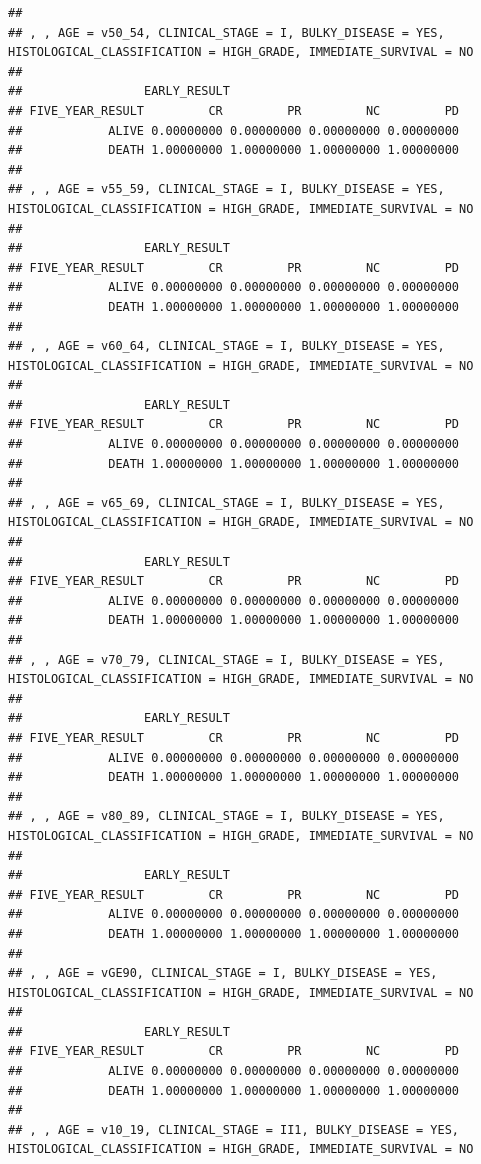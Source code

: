 \documentclass[]{article}
\begin{document}
\begin{verbatim}
## 
## , , AGE = v50_54, CLINICAL_STAGE = I, BULKY_DISEASE = YES, HISTOLOGICAL_CLASSIFICATION = HIGH_GRADE, IMMEDIATE_SURVIVAL = NO
## 
##                 EARLY_RESULT
## FIVE_YEAR_RESULT         CR         PR         NC         PD
##            ALIVE 0.00000000 0.00000000 0.00000000 0.00000000
##            DEATH 1.00000000 1.00000000 1.00000000 1.00000000
## 
## , , AGE = v55_59, CLINICAL_STAGE = I, BULKY_DISEASE = YES, HISTOLOGICAL_CLASSIFICATION = HIGH_GRADE, IMMEDIATE_SURVIVAL = NO
## 
##                 EARLY_RESULT
## FIVE_YEAR_RESULT         CR         PR         NC         PD
##            ALIVE 0.00000000 0.00000000 0.00000000 0.00000000
##            DEATH 1.00000000 1.00000000 1.00000000 1.00000000
## 
## , , AGE = v60_64, CLINICAL_STAGE = I, BULKY_DISEASE = YES, HISTOLOGICAL_CLASSIFICATION = HIGH_GRADE, IMMEDIATE_SURVIVAL = NO
## 
##                 EARLY_RESULT
## FIVE_YEAR_RESULT         CR         PR         NC         PD
##            ALIVE 0.00000000 0.00000000 0.00000000 0.00000000
##            DEATH 1.00000000 1.00000000 1.00000000 1.00000000
## 
## , , AGE = v65_69, CLINICAL_STAGE = I, BULKY_DISEASE = YES, HISTOLOGICAL_CLASSIFICATION = HIGH_GRADE, IMMEDIATE_SURVIVAL = NO
## 
##                 EARLY_RESULT
## FIVE_YEAR_RESULT         CR         PR         NC         PD
##            ALIVE 0.00000000 0.00000000 0.00000000 0.00000000
##            DEATH 1.00000000 1.00000000 1.00000000 1.00000000
## 
## , , AGE = v70_79, CLINICAL_STAGE = I, BULKY_DISEASE = YES, HISTOLOGICAL_CLASSIFICATION = HIGH_GRADE, IMMEDIATE_SURVIVAL = NO
## 
##                 EARLY_RESULT
## FIVE_YEAR_RESULT         CR         PR         NC         PD
##            ALIVE 0.00000000 0.00000000 0.00000000 0.00000000
##            DEATH 1.00000000 1.00000000 1.00000000 1.00000000
## 
## , , AGE = v80_89, CLINICAL_STAGE = I, BULKY_DISEASE = YES, HISTOLOGICAL_CLASSIFICATION = HIGH_GRADE, IMMEDIATE_SURVIVAL = NO
## 
##                 EARLY_RESULT
## FIVE_YEAR_RESULT         CR         PR         NC         PD
##            ALIVE 0.00000000 0.00000000 0.00000000 0.00000000
##            DEATH 1.00000000 1.00000000 1.00000000 1.00000000
## 
## , , AGE = vGE90, CLINICAL_STAGE = I, BULKY_DISEASE = YES, HISTOLOGICAL_CLASSIFICATION = HIGH_GRADE, IMMEDIATE_SURVIVAL = NO
## 
##                 EARLY_RESULT
## FIVE_YEAR_RESULT         CR         PR         NC         PD
##            ALIVE 0.00000000 0.00000000 0.00000000 0.00000000
##            DEATH 1.00000000 1.00000000 1.00000000 1.00000000
## 
## , , AGE = v10_19, CLINICAL_STAGE = II1, BULKY_DISEASE = YES, HISTOLOGICAL_CLASSIFICATION = HIGH_GRADE, IMMEDIATE_SURVIVAL = NO

\end{verbatim}
\end{document}

